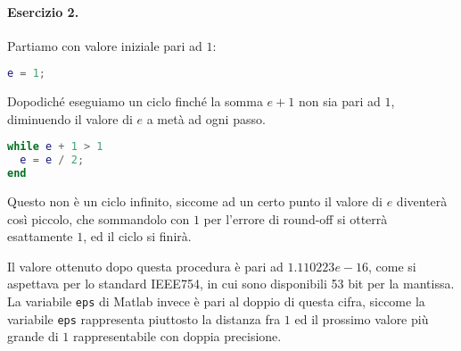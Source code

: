 \paragraph{Esercizio 2.} Partiamo con valore iniziale pari ad $1$:

\begin{lstlisting}[language=Matlab]
e = 1;
\end{lstlisting}

Dopodiché eseguiamo un ciclo finché la somma $e+1$ non sia pari ad $1$, diminuendo il valore di $e$ a metà ad ogni passo.

\begin{lstlisting}[language=Matlab]
while e + 1 > 1
  e = e / 2;
end
\end{lstlisting}

Questo non è un ciclo infinito, siccome ad un certo punto il valore di $e$ diventerà così piccolo, che sommandolo con $1$ per l'errore di round-off si otterrà esattamente $1$, ed il ciclo si finirà.

Il valore ottenuto dopo questa procedura è pari ad $1.110223e-16$, come si aspettava per lo standard IEEE754, in cui sono disponibili 53 bit per la mantissa. La variabile \verb|eps| di Matlab invece è pari al doppio di questa cifra, siccome la variabile \verb|eps| rappresenta piuttosto la distanza fra $1$ ed il prossimo valore più grande di $1$ rappresentabile con doppia precisione.
